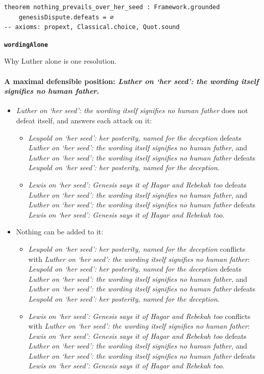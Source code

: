 \documentclass[11pt]{article}
\begin{document}
{\small\begin{verbatim}
theorem nothing_prevails_over_her_seed : Framework.grounded
    genesisDispute.defeats = ∅
-- axioms: propext, Classical.choice, Quot.sound
\end{verbatim}}
\par\medskip\noindent\textbf{\texttt{wording\allowbreak{}Alone}}\par\nobreak\noindent
Why Luther alone is one resolution.

\paragraph{A maximal defensible position: \emph{Luther on ‘her seed’: the wording itself signifies no human father}.}
\begin{itemize}
\item \emph{Luther on ‘her seed’: the wording itself signifies no human father} does not defeat itself, and answers each attack on it:
\begin{itemize}
\item \emph{Leupold on ‘her seed’: her posterity, named for the deception} defeats \emph{Luther on ‘her seed’: the wording itself signifies no human father}, and \emph{Luther on ‘her seed’: the wording itself signifies no human father} defeats \emph{Leupold on ‘her seed’: her posterity, named for the deception}.
\item \emph{Lewis on ‘her seed’: Genesis says it of Hagar and Rebekah too} defeats \emph{Luther on ‘her seed’: the wording itself signifies no human father}, and \emph{Luther on ‘her seed’: the wording itself signifies no human father} defeats \emph{Lewis on ‘her seed’: Genesis says it of Hagar and Rebekah too}.
\end{itemize}
\item Nothing can be added to it:
\begin{itemize}
\item \emph{Leupold on ‘her seed’: her posterity, named for the deception} conflicts with \emph{Luther on ‘her seed’: the wording itself signifies no human father}: \emph{Leupold on ‘her seed’: her posterity, named for the deception} defeats \emph{Luther on ‘her seed’: the wording itself signifies no human father}, and \emph{Luther on ‘her seed’: the wording itself signifies no human father} defeats \emph{Leupold on ‘her seed’: her posterity, named for the deception}.
\item \emph{Lewis on ‘her seed’: Genesis says it of Hagar and Rebekah too} conflicts with \emph{Luther on ‘her seed’: the wording itself signifies no human father}: \emph{Lewis on ‘her seed’: Genesis says it of Hagar and Rebekah too} defeats \emph{Luther on ‘her seed’: the wording itself signifies no human father}, and \emph{Luther on ‘her seed’: the wording itself signifies no human father} defeats \emph{Lewis on ‘her seed’: Genesis says it of Hagar and Rebekah too}.
\end{itemize}
\end{itemize}
\end{document}
